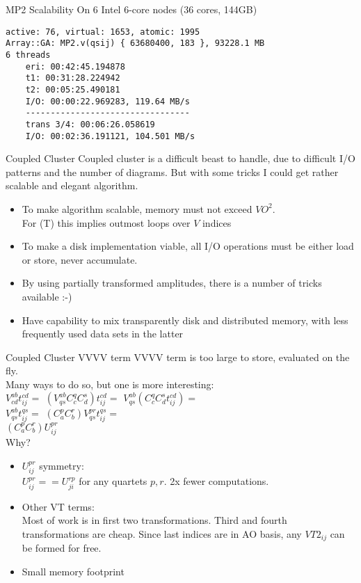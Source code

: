 \documentclass{beamer}
\begin{document}
\begin{frame}[fragile]{MP2 Scalability}
On 6 Intel 6-core nodes (36 cores, 144GB)
\begin{verbatim}
active: 76, virtual: 1653, atomic: 1995
Array::GA: MP2.v(qsij) { 63680400, 183 }, 93228.1 MB
6 threads
    eri: 00:42:45.194878
    t1: 00:31:28.224942
    t2: 00:05:25.490181
    I/O: 00:00:22.969283, 119.64 MB/s
    ---------------------------------
    trans 3/4: 00:06:26.058619
    I/O: 00:02:36.191121, 104.501 MB/s
\end{verbatim}
\end{frame}


 
\begin{frame}[fragile]{Coupled Cluster}
  Coupled cluster is a difficult beast to handle, due to difficult
  I/O patterns and the number of diagrams.  But with some tricks I
  could get rather scalable and elegant algorithm.
\begin{itemize}
  \item To make algorithm scalable, memory must not exceed $VO^2$.\\
    For (T) this implies  outmost loops over $V$ indices
\item To make a disk implementation viable, all I/O operations must be
  either load or store,  never accumulate.
\item By using partially transformed amplitudes, there is a number of
  tricks available :-)
\item Have capability to mix  transparently disk and distributed
  memory, with less frequently used data sets in the latter
\end{itemize}
\end{frame}

\begin{frame}[fragile]{Coupled Cluster VVVV term}
  VVVV term is too large to store, evaluated on the fly. \\
  Many ways to do so, but one is more interesting:\\

  $V^{ab}_{cd} t^{cd}_{ij} = $ 
  $(V^{ab}_{qs} C^q_c C^s_d) t^{cd}_{ij} = $
  $V^{ab}_{qs} (C^q_c C^s_d t^{cd}_{ij}) = $ \\
  $V^{ab}_{qs} t^{qs}_{ij} = $ 
  $(C^p_a C^r_b) V^{pr}_{qs} t^{qs}_{ij} =$  \\
  $(C^p_a C^r_b) U^{pr}_{ij}$ \\

  Why?

  \begin{itemize}
  \item $U^{pr}_{ij}$ symmetry: \\
    $U^{pr}_{ij} == U^{rp}_{ji}$ for any quartets $p,r$.
    2x fewer computations.
  \item Other VT terms:\\
     Most of work is in first two transformations.
    Third and fourth transformations are cheap.  Since last indices are in
    AO basis, any $VT2_{ij}$ can be formed for free.
  \item Small memory footprint
  \end{itemize}
\end{frame}
\end{document}
